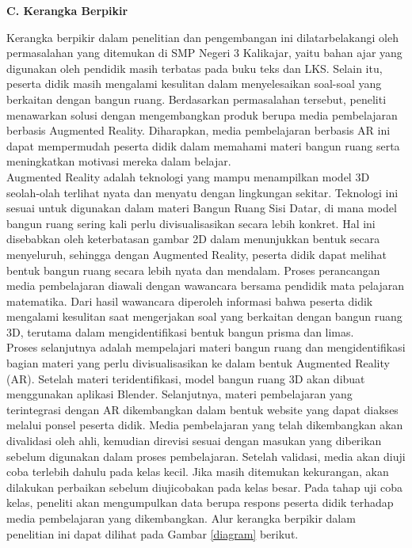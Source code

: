 \textbf{C. Kerangka Berpikir}\\
\hspace*{1cm}Kerangka berpikir dalam penelitian dan pengembangan ini dilatarbelakangi oleh permasalahan yang ditemukan di SMP Negeri 3 Kalikajar, yaitu bahan ajar yang digunakan oleh pendidik masih terbatas pada buku teks dan LKS. Selain itu, peserta didik masih mengalami kesulitan dalam menyelesaikan soal-soal yang berkaitan dengan bangun ruang. Berdasarkan permasalahan tersebut, peneliti menawarkan solusi dengan mengembangkan produk berupa media pembelajaran berbasis Augmented Reality. Diharapkan, media pembelajaran berbasis AR ini dapat mempermudah peserta didik dalam memahami materi bangun ruang serta meningkatkan motivasi mereka dalam belajar.\\
\hspace*{1cm}Augmented Reality adalah teknologi yang mampu menampilkan model 3D seolah-olah terlihat nyata dan menyatu dengan lingkungan sekitar. Teknologi ini sesuai untuk digunakan dalam materi Bangun Ruang Sisi Datar, di mana model bangun ruang sering kali perlu divisualisasikan secara lebih konkret. Hal ini disebabkan oleh keterbatasan gambar 2D dalam menunjukkan bentuk secara menyeluruh, sehingga dengan Augmented Reality, peserta didik dapat melihat bentuk bangun ruang secara lebih nyata dan mendalam. Proses perancangan media pembelajaran diawali dengan wawancara bersama pendidik mata pelajaran matematika. Dari hasil wawancara diperoleh informasi bahwa peserta didik mengalami kesulitan saat mengerjakan soal yang berkaitan dengan bangun ruang 3D, terutama dalam mengidentifikasi bentuk bangun prisma dan limas.\\
\hspace*{1cm}Proses selanjutnya adalah mempelajari materi bangun ruang dan mengidentifikasi bagian materi yang perlu divisualisasikan ke dalam bentuk Augmented Reality (AR). Setelah materi teridentifikasi, model bangun ruang 3D akan dibuat menggunakan aplikasi Blender. Selanjutnya, materi pembelajaran yang terintegrasi dengan AR dikembangkan dalam bentuk website yang dapat diakses melalui ponsel peserta didik. Media pembelajaran yang telah dikembangkan akan divalidasi oleh ahli, kemudian direvisi sesuai dengan masukan yang diberikan sebelum digunakan dalam proses pembelajaran. Setelah validasi, media akan diuji coba terlebih dahulu pada kelas kecil. Jika masih ditemukan kekurangan, akan dilakukan perbaikan sebelum diujicobakan pada kelas besar. Pada tahap uji coba kelas, peneliti akan mengumpulkan data berupa respons peserta didik terhadap media pembelajaran yang dikembangkan. Alur kerangka berpikir dalam penelitian ini dapat dilihat pada Gambar \ref{diagram} berikut.\\

